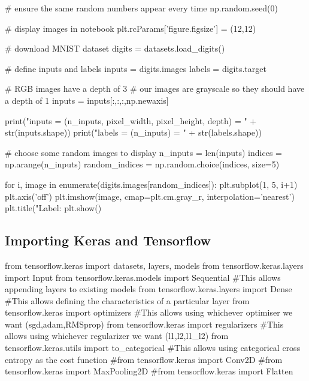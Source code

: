 \documentclass[%
oneside,                 %
final,                   %
10pt]{article}
\begin{document}
# ensure the same random numbers appear every time
np.random.seed(0)

# display images in notebook
plt.rcParams['figure.figsize'] = (12,12)


# download MNIST dataset
digits = datasets.load_digits()

# define inputs and labels
inputs = digits.images
labels = digits.target

# RGB images have a depth of 3
# our images are grayscale so they should have a depth of 1
inputs = inputs[:,:,:,np.newaxis]

print("inputs = (n_inputs, pixel_width, pixel_height, depth) = " + str(inputs.shape))
print("labels = (n_inputs) = " + str(labels.shape))


# choose some random images to display
n_inputs = len(inputs)
indices = np.arange(n_inputs)
random_indices = np.random.choice(indices, size=5)

for i, image in enumerate(digits.images[random_indices]):
    plt.subplot(1, 5, i+1)
    plt.axis('off')
    plt.imshow(image, cmap=plt.cm.gray_r, interpolation='nearest')
    plt.title("Label: %
plt.show()

\epycod


\subsection{Importing Keras and Tensorflow}























\bpycod
from tensorflow.keras import datasets, layers, models
from tensorflow.keras.layers import Input
from tensorflow.keras.models import Sequential      #This allows appending layers to existing models
from tensorflow.keras.layers import Dense           #This allows defining the characteristics of a particular layer
from tensorflow.keras import optimizers             #This allows using whichever optimiser we want (sgd,adam,RMSprop)
from tensorflow.keras import regularizers           #This allows using whichever regularizer we want (l1,l2,l1_l2)
from tensorflow.keras.utils import to_categorical   #This allows using categorical cross entropy as the cost function
#from tensorflow.keras import Conv2D
#from tensorflow.keras import MaxPooling2D
#from tensorflow.keras import Flatten
\end{document}
